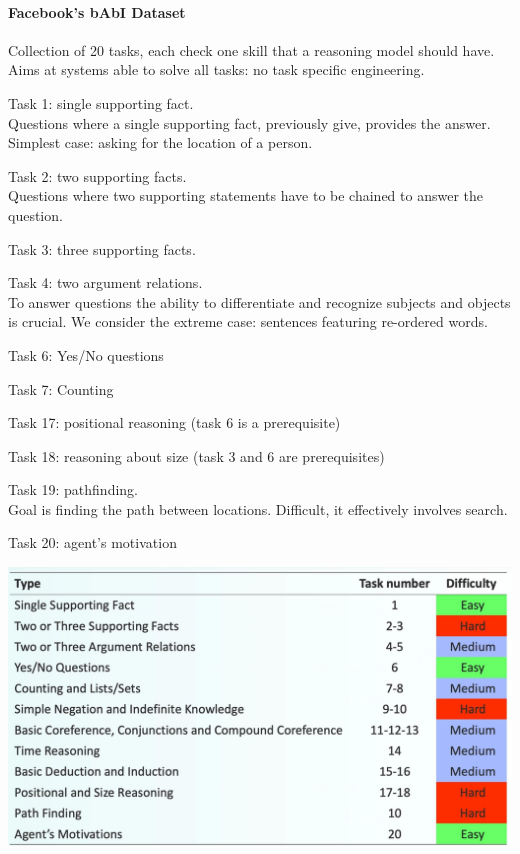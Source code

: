 \documentclass[10pt]{report}
\begin{document}
\paragraph{Facebook's bAbI Dataset} Collection of 20 tasks, each check one skill that a reasoning model should have. Aims at systems able to solve all tasks: no task specific engineering.
\begin{list}{}{}
	\item Task 1: single supporting fact.\\
	Questions where a single supporting fact, previously give, provides the answer. Simplest case: asking for the location of a person.
	\item Task 2: two supporting facts.\\
	Questions where two supporting statements have to be chained to answer the question.
	\item Task 3: three supporting facts.
	\item Task 4: two argument relations.\\
	To answer questions the ability to differentiate and recognize subjects and objects is crucial. We consider the extreme case: sentences featuring re-ordered words.
	\item Task 6: Yes/No questions
	\item Task 7: Counting
	\item Task 17: positional reasoning (task 6 is a prerequisite)
	\item Task 18: reasoning about size (task 3 and 6 are prerequisites)
	\item Task 19: pathfinding.\\
	Goal is finding the path between locations. Difficult, it effectively involves search.
	\item Task 20: agent's motivation
\end{list}
\begin{center}
	\includegraphics[scale=0.5]{97.png}
\end{center}
\end{document}
